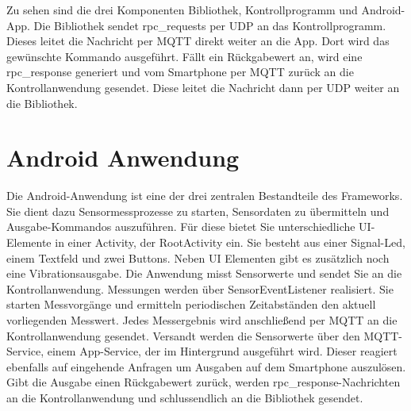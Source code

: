 \documentclass[11pt,a4paper]{report}
\begin{document}
Zu sehen sind die drei Komponenten Bibliothek, Kontrollprogramm und Android-App.
Die Bibliothek sendet rpc\_requests per UDP an das Kontrollprogramm.
Dieses leitet die Nachricht per MQTT direkt weiter an die App.
Dort wird das gewünschte Kommando ausgeführt.
Fällt ein Rückgabewert an, wird eine rpc\_response generiert und vom Smartphone per MQTT zurück an die Kontrollanwendung gesendet.
Diese leitet die Nachricht dann per UDP weiter an die Bibliothek.

\chapter{Android Anwendung}\label{chap:app}
Die Android-Anwendung ist eine der drei zentralen Bestandteile des Frameworks.
Sie dient dazu Sensormessprozesse zu starten, Sensordaten zu übermitteln und Ausgabe-Kommandos auszuführen.
Für diese bietet Sie unterschiedliche UI-Elemente in einer Activity, der RootActivity ein.
Sie besteht aus einer Signal-Led, einem Textfeld und zwei Buttons.
Neben UI Elementen gibt es zusätzlich noch eine Vibrationsausgabe. 
Die Anwendung misst Sensorwerte und sendet Sie an die Kontrollanwendung.
Messungen werden über SensorEventListener realisiert.
Sie starten Messvorgänge und ermitteln periodischen Zeitabständen den aktuell vorliegenden Messwert.
Jedes Messergebnis wird anschließend per MQTT an die Kontrollanwendung gesendet.
Versandt werden die Sensorwerte über den MQTT-Service, einem App-Service, der im Hintergrund ausgeführt wird.
Dieser reagiert ebenfalls auf eingehende Anfragen um Ausgaben auf dem Smartphone auszulösen.
Gibt die Ausgabe einen Rückgabewert zurück, werden rpc\_response-Nachrichten an die Kontrollanwendung und schlussendlich an die Bibliothek gesendet.
\end{document}
